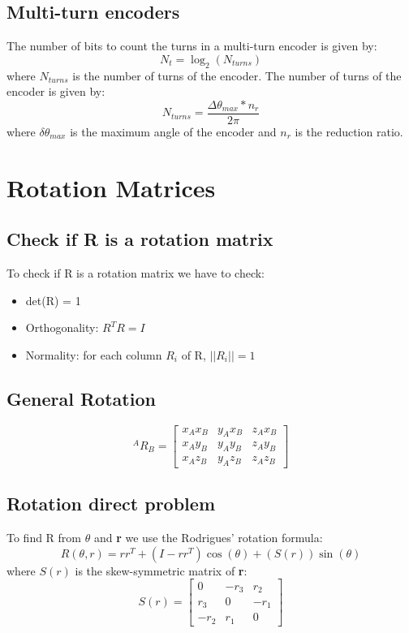 \documentclass[11pt]{article}
\begin{document}
\subsection{Multi-turn encoders}
The number of bits to count the turns in a multi-turn encoder is given by:
\begin{equation}
    N_t = \log_2(N_{turns})
\end{equation}
where $N_{turns}$ is the number of turns of the encoder.
The number of turns of the encoder is given by:
\begin{equation}
    N_{turns} = \frac{\Delta\theta_{max}*n_r}{2\pi}
\end{equation}
where $\delta\theta_{max}$ is the maximum angle of the encoder and $n_r$ is the reduction ratio.
\section{Rotation Matrices}\label{sec:rotation}
\subsection{Check if R is a rotation matrix}\label{sec:check_rotation}
To check if R is a rotation matrix we have to check:
\begin{itemize}
\item det(R) = 1
\item Orthogonality: $R^TR = I$
\item Normality: for each column $R_i$ of R, $||R_i|| = 1$
\end{itemize}
\subsection{General Rotation}
\begin{equation}
^{A}R_B = \begin{bmatrix}
x_A  x_B & y_A x_B & z_A x_B \\
x_A  y_B & y_A y_B & z_A y_B \\
x_A  z_B & y_A z_B & z_A z_B
\end{bmatrix}
\end{equation}

\subsection{Rotation direct problem}
To find R from $\theta$ and \textbf{r} we use the Rodrigues' rotation formula:
\begin{equation}
R(\theta, r)= rr^T+ (I-rr^T)\cos(\theta) + (S(r))\sin(\theta)
\end{equation}
where $S(r)$ is the skew-symmetric matrix of \textbf{r}:
\begin{equation}
S(r) = \begin{bmatrix}
0 & -r_3 & r_2 \\
r_3 & 0 & -r_1 \\
-r_2 & r_1 & 0
\end{bmatrix}
\end{equation}
\end{document}
